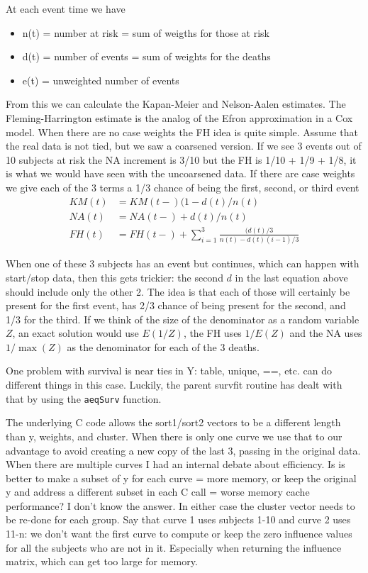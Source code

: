 \documentclass{article}
\newcommand{\code}[1]{\texttt{#1}}
\begin{document}
At each event time we have 
\begin{itemize}
  \item n(t) = number at risk = sum of weigths for those at risk
  \item d(t) = number of events = sum of weights for the deaths
  \item e(t) = unweighted number of events
\end{itemize}
From this we can calculate the Kapan-Meier and Nelson-Aalen estimates.
The Fleming-Harrington estimate is the analog of the Efron approximation
in a Cox model.
When there are no case weights the FH idea is quite simple.
Assume that the real data is not tied, but we saw a coarsened version.
If we see 3 events out of 10 subjects at risk the NA increment is 3/10 but the
FH is 1/10 + 1/9 + 1/8, it is what we would have seen with the 
uncoarsened data.
If there are case weights we give each of the 3 terms a 1/3 chance of being
the first, second, or third event
\begin{align*}
  KM(t) &= KM(t-) (1- d(t)/n(t) \\
  NA(t) &= NA(t-) + d(t)/n(t) \\
  FH(t) &= FH(t-) + \sum_{i=1}^{3} \frac{(d(t)/3}{n(t)- d(t)(i-1)/3}
\end{align*}

When one of these 3 subjects has an event but continues, which can happen with
start/stop data, then this gets trickier: the second $d$ in the last equation
above should include only the other 2.  The idea is that each of those will
certainly be present for the first event, has 2/3 chance of being present
for the second, and 1/3 for the third.
If we think of the size of the denominator as a random variable $Z$, an
exact solution would use $E(1/Z)$, the FH uses $1/E(Z)$ and the NA uses
$1/\max(Z)$ as the denominator for each of the 3 deaths.  

One problem with survival is near ties in Y: table, unique, ==, etc. can
do different things in this case.  Luckily, the parent survfit routine 
has dealt with that by using the \code{aeqSurv} function.

The underlying C code allows the sort1/sort2 vectors to be a different
length than y, weights, and cluster.  
When there is only one curve we use that to our advantage to avoid creating
a new copy of the last 3, passing in the original data.
When there are multiple curves  I had an internal debate about efficiency.
Is is better to make a subset of y for each curve = more memory, or keep the
original y and address a different subset in each C call = worse memory
cache performance?   I don't know the answer.
In either case the cluster vector needs to be re-done for each group.
Say that curve 1 uses subjects 1-10 and curve 2 uses 11-n: we don't want
the first curve to compute or keep the zero influence values for all the
subjects who are not in it.  
Especially when returning the influence matrix, which can get too large
for memory.
\end{document}
